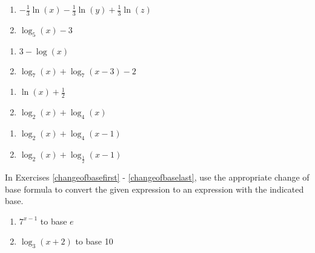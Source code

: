 \begin{multicols}{2}
\begin{enumerate}
\setcounter{enumi}{\value{HW}}

\item $-\frac{1}{3} \ln(x) - \frac{1}{3}\ln(y) + \frac{1}{3} \ln(z)$
\item $\log_{5}(x) - 3$

\setcounter{HW}{\value{enumi}}
\end{enumerate}
\end{multicols}

\begin{multicols}{2}
\begin{enumerate}
\setcounter{enumi}{\value{HW}}

\item $3 - \log(x)$
\item $\log_{7}(x) + \log_{7}(x - 3) - 2$

\setcounter{HW}{\value{enumi}}
\end{enumerate}
\end{multicols}

\begin{multicols}{2}
\begin{enumerate}
\setcounter{enumi}{\value{HW}}

\item $\ln(x) + \frac{1}{2}$ 
\item $\log_{2}(x) + \log_{4}(x)$ 

\setcounter{HW}{\value{enumi}}
\end{enumerate}
\end{multicols}

\begin{multicols}{2}
\begin{enumerate}
\setcounter{enumi}{\value{HW}}

\item $\log_{2}(x) + \log_{4}(x-1)$
\item $\log_{2}(x) + \log_{\frac{1}{2}}(x - 1)$ \label{combineloglast}

\setcounter{HW}{\value{enumi}}
\end{enumerate}
\end{multicols}


In Exercises \ref{changeofbasefirst} - \ref{changeofbaselast}, use the appropriate change of base formula to convert the given expression to an expression with the indicated base. 

\begin{multicols}{2}
\begin{enumerate}
\setcounter{enumi}{\value{HW}}

\item $7^{x - 1}$ to base $e$ \label{changeofbasefirst}
\item $\log_{3}(x + 2)$ to base 10

\setcounter{HW}{\value{enumi}}
\end{enumerate}
\end{multicols}

